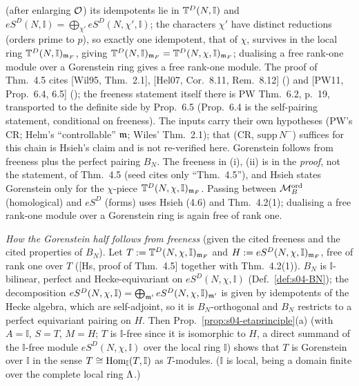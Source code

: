 (after enlarging $\mathcal{O}$) its idempotents lie in $\mathbb{T}^D(N,\mathbb I)$ and $eS^D(N,\mathbb I)=\bigoplus_{\chi'}eS^D(N,\chi',\mathbb I)$; the
characters $\chi'$ have distinct reductions (orders prime to $p$), so exactly one idempotent, that of $\chi$, survives in the local ring
$\mathbb{T}^D(N,\mathbb I)_{\mathfrak{m}_F}$, giving $\mathbb{T}^D(N,\mathbb I)_{\mathfrak{m}_F}=\mathbb{T}^D(N,\chi,\mathbb I)_{\mathfrak{m}_F}$; dualising a free rank-one module over a
Gorenstein ring gives a free rank-one module. The proof of Thm.~4.5 cites [Wil95, Thm.~2.1], [Hel07, Cor.~8.11, Rem.~8.12]
() and [PW11, Prop.~6.4, 6.5]
(); the
freeness statement itself there is PW Thm.~6.2, p.~19, transported to the definite side by Prop.~6.5 (Prop.~6.4 is the self-pairing
statement, conditional on freeness). The inputs carry their own hypotheses (PW's CR; Helm's ``controllable'' $\mathfrak{m}$; Wiles' Thm.~2.1);
that (CR, $\mathrm{supp}\,N^-$) suffices for this chain is Hsieh's claim and is not re-verified here. Gorenstein
follows from freeness plus the perfect pairing $B_N$. The freeness in (i), (ii) is in the \emph{proof}, not the statement, of
Thm.~4.5 (seed cites only ``Thm.~4.5''), and Hsieh states Gorenstein only for the $\chi$-piece $\mathbb{T}^D(N,\chi,\mathbb I)_{\mathfrak{m}_F}$. Passing between $\mathcal{M}^{\mathrm{ord}}_B$ (homological) and $eS^D$ (forms) uses Hsieh (4.6) and
Thm.~4.2(1); dualising a free rank-one module over a Gorenstein ring is again free of rank one.

\noindent\emph{How the Gorenstein half follows from freeness} \stproved{} (given the cited freeness and the cited properties of $B_N$).
Let $T:=\mathbb{T}^D(N,\chi,\mathbb I)_{\mathfrak{m}_F}$ and $H:=eS^D(N,\chi,\mathbb I)_{\mathfrak{m}_F}$, free of rank one over $T$ ([Hs, proof of Thm.~4.5] together with
Thm.~4.2(1)). $B_N$ is $\mathbb I$-bilinear, perfect and Hecke-equivariant on $eS^D(N,\chi,\mathbb I)$ (Def.~\ref{def:s04-BN}); the
decomposition $eS^D(N,\chi,\mathbb I)=\bigoplus_{\mathfrak{m}'}eS^D(N,\chi,\mathbb I)_{\mathfrak{m}'}$ is given by idempotents of the Hecke algebra, which are
self-adjoint, so it is $B_N$-orthogonal and $B_N$ restricts to a perfect equivariant pairing on $H$. Then Prop.~\ref{prop:s04-etaprinciple}(a)
(with $A=\mathbb I$, $S=T$, $M=H$; $T$ is $\mathbb I$-free since it is isomorphic to $H$, a direct summand of the $\mathbb I$-free module
$eS^D(N,\chi,\mathbb I)$ over the local ring $\mathbb I$) shows that $T$ is Gorenstein over $\mathbb I$ in the sense
$T\cong\operatorname{Hom}_{\mathbb I}(T,\mathbb I)$ as $T$-modules. ($\mathbb I$ is local, being a domain finite over the complete local ring $\Lambda$.)


